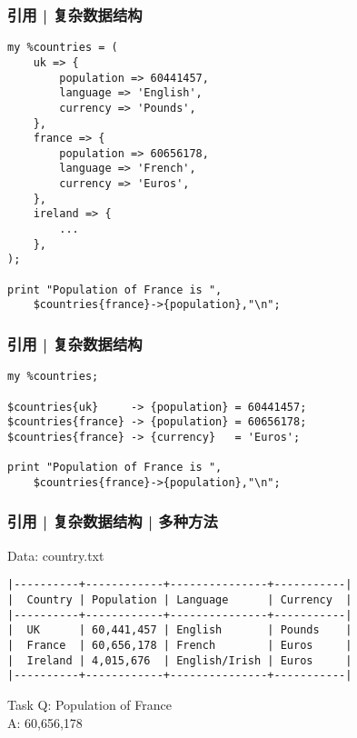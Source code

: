 \begin{frame}[fragile]
  \frametitle{引用 | 复杂数据结构}
  \vspace{-1.5em}
\begin{lstlisting}[basicstyle=\small\tt]
my %countries = (
    uk => {
        population => 60441457,
        language => 'English',
        currency => 'Pounds',
    },
    france => {
        population => 60656178,
        language => 'French',
        currency => 'Euros',
    },
    ireland => {
        ...
    },
);

print "Population of France is ",
    $countries{france}->{population},"\n";
\end{lstlisting}
\end{frame}

\begin{frame}[fragile]
  \frametitle{引用 | 复杂数据结构}
  \vspace{-1.5em}
\begin{lstlisting}[basicstyle=\small\tt]
my %countries;

$countries{uk}     -> {population} = 60441457;
$countries{france} -> {population} = 60656178;
$countries{france} -> {currency}   = 'Euros';

print "Population of France is ",
    $countries{france}->{population},"\n";
\end{lstlisting}
\end{frame}

\begin{frame}[fragile]
  \frametitle{引用 | 复杂数据结构 | 多种方法}
  \begin{block}{Data: country.txt}
  \vspace{-0.5em}
\begin{lstlisting}[basicstyle=\footnotesize\tt,numberstyle=\scriptsize]
|----------+------------+---------------+-----------|
|  Country | Population | Language      | Currency  |
|----------+------------+---------------+-----------|
|  UK      | 60,441,457 | English       | Pounds    |
|  France  | 60,656,178 | French        | Euros     |
|  Ireland | 4,015,676  | English/Irish | Euros     |
|----------+------------+---------------+-----------|
\end{lstlisting}
  \end{block}
  \pause
  \begin{block}{Task}
    Q: Population of France\\
    A: 60,656,178
  \end{block}
\end{frame}

